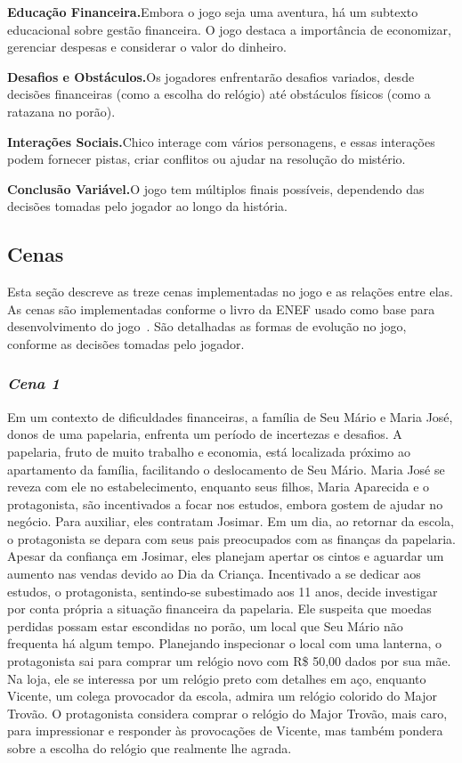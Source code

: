 \medskip\noindent \textbf{Educação Financeira.}\quad Embora o jogo seja uma aventura, há um subtexto educacional sobre gestão financeira. O jogo destaca a importância de economizar, gerenciar despesas e considerar o valor do dinheiro.

\medskip\noindent \textbf{Desafios e Obstáculos.}\quad Os jogadores enfrentarão desafios variados, desde decisões financeiras (como a escolha do relógio) até obstáculos físicos (como a ratazana no porão).

\medskip\noindent \textbf{Interações Sociais.}\quad Chico interage com vários personagens, e essas interações podem fornecer pistas, criar conflitos ou ajudar na resolução do mistério.

\medskip\noindent \textbf{Conclusão Variável.}\quad O jogo tem múltiplos finais possíveis, dependendo das decisões tomadas pelo jogador ao longo da história.


\subsection{Cenas}

Esta seção descreve as treze cenas implementadas no jogo e as relações entre elas. As cenas são implementadas conforme o livro da ENEF usado como base para desenvolvimento do jogo~\cite{Livro_ENEF_5_Ano}. São detalhadas as formas de evolução no jogo, conforme as decisões tomadas pelo jogador.

\subsubsection*{\textit{\textbf{Cena 1}}}

Em um contexto de dificuldades financeiras, a família de Seu Mário e Maria José, donos de uma papelaria, enfrenta um período de incertezas e desafios. A papelaria, fruto de muito trabalho e economia, está localizada próximo ao apartamento da família, facilitando o deslocamento de Seu Mário. Maria José se reveza com ele no estabelecimento, enquanto seus filhos, Maria Aparecida e o protagonista, são incentivados a focar nos estudos, embora gostem de ajudar no negócio. Para auxiliar, eles contratam Josimar. Em um dia, ao retornar da escola, o protagonista se depara com seus pais preocupados com as finanças da papelaria. Apesar da confiança em Josimar, eles planejam apertar os cintos e aguardar um aumento nas vendas devido ao Dia da Criança. Incentivado a se dedicar aos estudos, o protagonista, sentindo-se subestimado aos 11 anos, decide investigar por conta própria a situação financeira da papelaria. Ele suspeita que moedas perdidas possam estar escondidas no porão, um local que Seu Mário não frequenta há algum tempo. Planejando inspecionar o local com uma lanterna, o protagonista sai para comprar um relógio novo com R\$ 50,00 dados por sua mãe. Na loja, ele se interessa por um relógio preto com detalhes em aço, enquanto Vicente, um colega provocador da escola, admira um relógio colorido do Major Trovão. O protagonista considera comprar o relógio do Major Trovão, mais caro, para impressionar e responder às provocações de Vicente, mas também pondera sobre a escolha do relógio que realmente lhe agrada.

